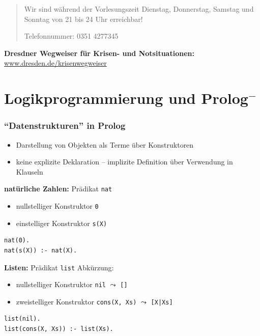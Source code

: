 \documentclass{beamer}
\begin{document}
{\begin{frame}
\begin{quote}
		Wir sind während der Vorlesungszeit Dienstag, Donnerstag, Samstag und Sonntag von 21 bis 24 Uhr erreichbar!
		
		Telefonnummer: 0351 4277345		
	\end{quote}

	\textbf{Dresdner Wegweiser für Krisen- und Notsituationen:} \url{www.dresden.de/krisenwegweiser}
\end{frame}

}



\section{Logikprogrammierung und Prolog${}^-$}


\begin{frame}[fragile] \frametitle{\enquote{Datenstrukturen} in Prolog}
	\footnotesize
	\begin{itemize}
		\item Darstellung von Objekten als Terme über Konstruktoren
		\item keine explizite Deklaration -- implizite Definition über Verwendung in Klauseln
	\end{itemize}
	
	\textbf{natürliche Zahlen:} Prädikat \texttt{nat}
	\vspace{-.75em}
	\begin{itemize} 
		\item nullstelliger Konstruktor \texttt{0} 
		\item einstelliger Konstruktor \texttt{s(X)}
	\end{itemize}
	
	\begin{lstlisting}
nat(0).
nat(s(X)) :- nat(X).
	\end{lstlisting}
	
	\textbf{Listen:} Prädikat \texttt{list}
	\hfill Abkürzung:
	\vspace{-.75em}
	\begin{itemize} 
		\item nullstelliger Konstruktor \texttt{nil} 
		\hfill $\leadsto$ \texttt{[]} 
		\item zweistelliger Konstruktor \texttt{cons(X, Xs)}
		\hfill $\leadsto$ \texttt{[X|Xs]}
	\end{itemize}
	
	\begin{lstlisting}[firstnumber=3]
list(nil).
list(cons(X, Xs)) :- list(Xs).
	\end{lstlisting}
\end{frame}
\end{document}
